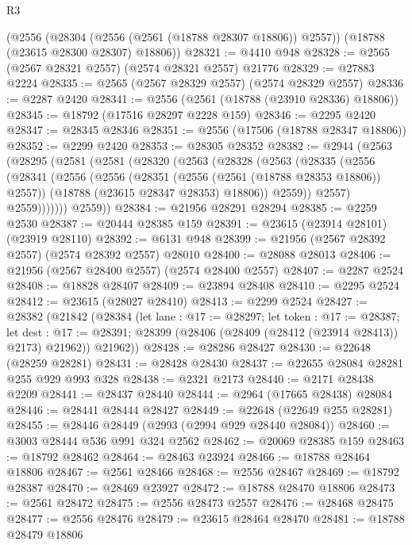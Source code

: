 \begin{lexlean}{R3}
\begin{coremodule}
    (@2556
      (@28304 (@2556 (@2561 (@18788 @28307 @18806)) @2557))
      (@18788 (@23615 @28300 @28307) @18806))
@28321 := @4410 @948
@28328 := @2565 (@2567 @28321 @2557) (@2574 @28321 @2557) @21776
@28329 := @27883 @2224
@28335 := @2565 (@2567 @28329 @2557) (@2574 @28329 @2557)
@28336 := @2287 @2420
@28341 := @2556 (@2561 (@18788 (@23910 @28336) @18806))
@28345 := @18792 (@17516 @28297 @2228 @159)
@28346 := @2295 @2420
@28347 := @28345 @28346
@28351 := @2556 (@17506 (@18788 @28347 @18806))
@28352 := @2299 @2420
@28353 := @28305 @28352
@28382 := @2944
    (@2563
      (@28295
        (@2581
          (@2581
            (@28320
              (@2563
                (@28328
                  (@2563
                    (@28335
                      (@2556
                        (@28341
                          (@2556
                            (@2556
                              (@28351 (@2556 (@2561 (@18788 @28353 @18806)) @2557))
                              (@18788 (@23615 @28347 @28353) @18806))
                            @2559))
                        @2557)
                      @2559)))))))
        @2559))
@28384 := @21956 @28291 @28294
@28385 := @2259 @2530
@28387 := @20444 @28385 @159
@28391 := @23615 (@23914 @28101) (@23919 @28110)
@28392 := @6131 @948
@28399 := @21956 (@2567 @28392 @2557) (@2574 @28392 @2557) @28010
@28400 := @28088 @28013
@28406 := @21956 (@2567 @28400 @2557) (@2574 @28400 @2557)
@28407 := @2287 @2524
@28408 := @18828 @28407
@28409 := @23894 @28408
@28410 := @2295 @2524
@28412 := @23615 (@28027 @28410)
@28413 := @2299 @2524
@28427 := @28382
    (@21842
      (@28384
        (let lane : @17 := @28297;
        let token : @17 := @28387;
        let dest : @17 := @28391; @28399 (@28406 (@28409 (@28412 (@23914 @28413)) @2173) @21962))
        @21962))
@28428 := @28286 @28427
@28430 := @22648 (@28259 @28281)
@28431 := @28428 @28430
@28437 := @22655 @28084 @28281 @255 @929 @993 @328
@28438 := @2321 @2173
@28440 := @2171 @28438 @2209
@28441 := @28437 @28440
@28444 := @2964 (@17665 @28438) @28084
@28446 := @28441 @28444 @28427
@28449 := @22648 (@22649 @255 @28281)
@28455 := @28446 @28449 (@2993 (@2994 @929 @28440 @28084))
@28460 := @3003 @28444 @536 @991 @324 @2562
@28462 := @20069 @28385 @159
@28463 := @18792 @28462
@28464 := @28463 @23924
@28466 := @18788 @28464 @18806
@28467 := @2561 @28466
@28468 := @2556 @28467
@28469 := @18792 @28387
@28470 := @28469 @23927
@28472 := @18788 @28470 @18806
@28473 := @2561 @28472
@28475 := @2556 @28473 @2557
@28476 := @28468 @28475
@28477 := @2556 @28476
@28479 := @23615 @28464 @28470
@28481 := @18788 @28479 @18806

\end{coremodule}
\end{lexlean}

